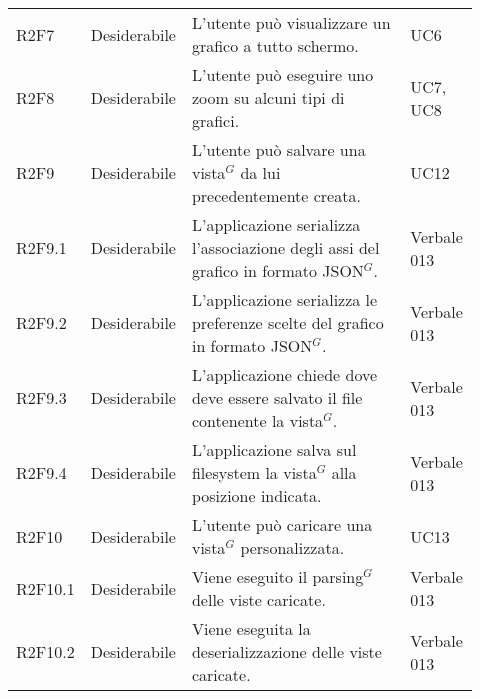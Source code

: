 {\begin{longtable}{p{0.12\linewidth}p{0.15\linewidth}p{0.50\linewidth}p{0.15\linewidth}}
    \rowcolor[RGB]{233, 245, 206}
    R2F7 & Desiderabile & L'utente può visualizzare un grafico a tutto schermo. & UC6\\
    \rowcolor[RGB]{216, 235, 171}
    R2F8 & Desiderabile & L'utente può eseguire uno zoom su alcuni tipi di grafici. & UC7, UC8\\
    \rowcolor[RGB]{233, 245, 206}
    R2F9 & Desiderabile & L'utente può salvare una vista$^{G}$ da lui precedentemente creata. & UC12\\
    \rowcolor[RGB]{216, 235, 171}
    R2F9.1 & Desiderabile & L'applicazione serializza l'associazione degli assi del grafico in formato JSON$^{G}$.& Verbale 013 \\
    \rowcolor[RGB]{233, 245, 206}
    R2F9.2 & Desiderabile & L'applicazione serializza le preferenze scelte del grafico in formato JSON$^{G}$.& Verbale 013 \\
    \rowcolor[RGB]{216, 235, 171}
    R2F9.3 & Desiderabile & L'applicazione chiede dove deve essere salvato il file  contenente la vista$^{G}$.& Verbale 013 \\
    \rowcolor[RGB]{233, 245, 206}
    R2F9.4 & Desiderabile & L'applicazione salva sul filesystem la vista$^{G}$ alla posizione indicata.& Verbale 013 \\

    \rowcolor[RGB]{216, 235, 171}
    R2F10 & Desiderabile & L'utente può caricare una vista$^{G}$ personalizzata.  & UC13\\
    \rowcolor[RGB]{233, 245, 206}
    R2F10.1 & Desiderabile & Viene eseguito il parsing$^{G}$ delle viste caricate. & Verbale 013 \\
    \rowcolor[RGB]{216, 235, 171}
    R2F10.2 & Desiderabile & Viene eseguita la deserializzazione delle viste caricate. & Verbale 013 \\


\end{longtable}}
